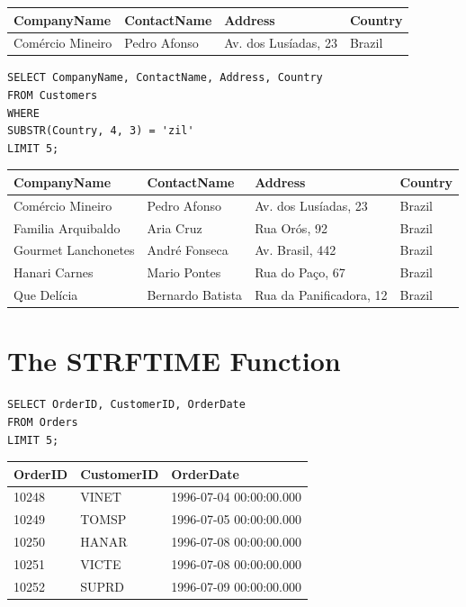 \documentclass[10pt]{article}
\begin{document}
\begin{table}[H]
\begin{tabular}{|l|l|l|l|}
\hline
CompanyName	& ContactName	& Address	& Country \\
\hline
Comércio Mineiro	& Pedro Afonso	& Av. dos Lusíadas, 23	& Brazil \\
\hline
\end{tabular}
\end{table}


\begin{verbatim}
SELECT CompanyName, ContactName, Address, Country 
FROM Customers 
WHERE 
SUBSTR(Country, 4, 3) = 'zil'
LIMIT 5;
\end{verbatim}

\begin{table}[H]
\begin{tabular}{|l|l|l|l|}
\hline
CompanyName	& ContactName	& Address	& Country \\
\hline
Comércio Mineiro	& Pedro Afonso	& Av. dos Lusíadas, 23	& Brazil \\
Familia Arquibaldo	& Aria Cruz	& Rua Orós, 92	& Brazil \\
Gourmet Lanchonetes	& André Fonseca	& Av. Brasil, 442	& Brazil \\
Hanari Carnes	& Mario Pontes	& Rua do Paço, 67	& Brazil \\
Que Delícia	& Bernardo Batista	& Rua da Panificadora, 12	& Brazil \\
\hline
\end{tabular}
\end{table}


\section{The STRFTIME Function}

\begin{verbatim}
SELECT OrderID, CustomerID, OrderDate 
FROM Orders
LIMIT 5;
\end{verbatim}


\begin{table}[H]
\begin{tabular}{|l|l|l|}
\hline
OrderID	& CustomerID	& OrderDate \\
\hline
10248	& VINET	& 1996-07-04 00:00:00.000 \\
10249	& TOMSP	& 1996-07-05 00:00:00.000 \\
10250	& HANAR	& 1996-07-08 00:00:00.000 \\
10251	& VICTE	& 1996-07-08 00:00:00.000 \\
10252	& SUPRD	& 1996-07-09 00:00:00.000 \\
\hline
\end{tabular}
\end{table}
\end{document}
